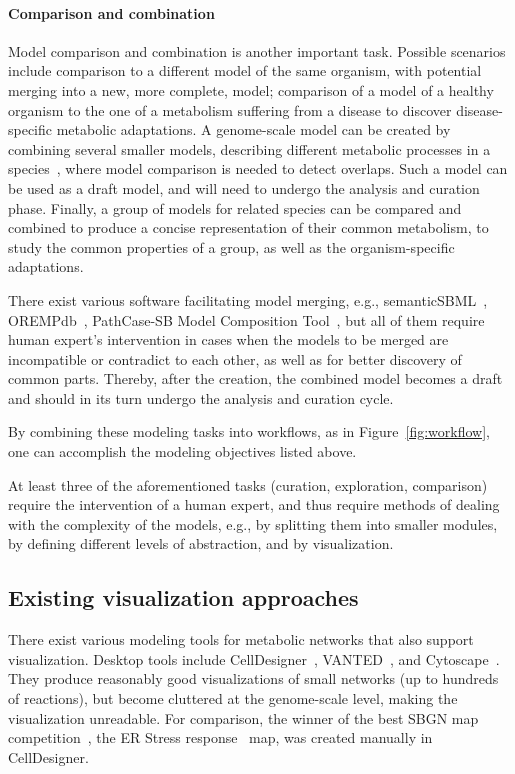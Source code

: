 \documentclass{bmcart}
\begin{document}
\paragraph{Comparison and combination}
Model comparison and combination is another important task. Possible scenarios include comparison to a different model of the same organism, with potential merging into a new, more complete, model; comparison of a model of a healthy organism to the one of a metabolism suffering from a disease to discover disease-specific metabolic adaptations.
A genome-scale model can be created by combining several smaller models, describing different metabolic processes in a species~\cite{Schulz2006}, where model comparison is needed to detect overlaps. Such a model can be used as a draft model, and will need to undergo the analysis and curation phase.
Finally, a group of models for related species can be compared and combined to produce a concise representation of their common metabolism, to study the common properties of a group, as well as the organism-specific adaptations.
 
There exist various software facilitating model merging, e.g.,  semanticSBML~\cite{Krause2010}, OREMPdb~\cite{Umeton2012}, PathCase-SB Model Composition Tool~\cite{Coskun2013}, but all of them require human expert's intervention in cases when the models to be merged are incompatible or contradict to each other, as well as for better discovery of common parts. Thereby, after the creation, the combined model becomes a draft and should in its turn undergo the analysis and curation cycle.

By combining these modeling tasks into workflows, as in Figure~\ref{fig:workflow}, one can accomplish the modeling objectives listed above.

At least three of the aforementioned tasks (curation, exploration, comparison) require the intervention of a human expert, and thus require methods of dealing with the complexity of the models, e.g., by splitting them into smaller modules, by defining different levels of abstraction, and by visualization.


\subsection*{Existing visualization approaches}
There exist various modeling tools for metabolic networks that also support visualization. Desktop tools include CellDesigner~\cite{Funahashi2008}, VANTED~\cite{Rohn2012}, and Cytoscape~\cite{Smoot2011}. They produce reasonably good visualizations of small networks (up to hundreds of reactions), but become cluttered at the genome-scale level, making the visualization unreadable. For comparison, the winner of the best SBGN map competition~\cite{SBGN}, the ER Stress response~\cite{Groenendyk2010} map,  was created manually in CellDesigner.
\end{document}
